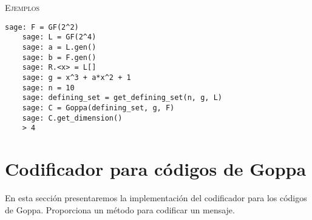 \begin{description}[leftmargin=1em, font=\normalfont\ttfamily, style=nextline]
\begin{description}[font=\ttfamily, style=nextline]
  \textsc{Ejemplos}
  \begin{lstlisting}[gobble=4]
    sage: F = GF(2^2)
    sage: L = GF(2^4)
    sage: a = L.gen()
    sage: b = F.gen()
    sage: R.<x> = L[]
    sage: g = x^3 + a*x^2 + 1
    sage: n = 10
    sage: defining_set = get_defining_set(n, g, L)
    sage: C = Goppa(defining_set, g, F)
    sage: C.get_dimension()
    > 4
  \end{lstlisting}
  \end{description}
\end{description}

\section{Codificador para códigos de Goppa}

En esta sección presentaremos la implementación del codificador para los códigos de Goppa. Proporciona un método para codificar un mensaje.

